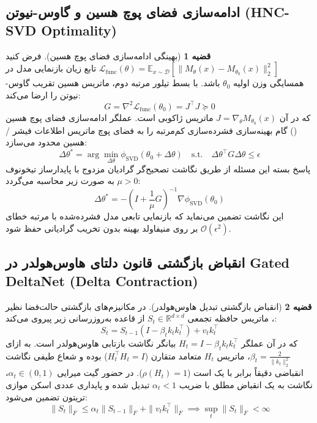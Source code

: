 \documentclass[12pt,a4paper]{report}
\theoremstyle{definition}
\newtheorem{theorem}{قضیه}[chapter]
\begin{document}
\subsection{ادامه‌سازی فضای پوچ هسین و گاوس-نیوتن (HNC-SVD Optimality)}
\begin{theorem}[بهینگی ادامه‌سازی فضای پوچ هسین]
\label{thm:hnc_optimality}
فرض کنید $\mathcal{L}_{\text{func}}(\theta) = \mathbb{E}_{x \sim \mathcal{D}} [ \| M_\theta(x) - M_{\theta_0}(x) \|_2^2 ]$ تابع زیان بازنمایی مدل در همسایگی وزن اولیه $\theta_0$ باشد. با بسط تیلور مرتبه دوم، ماتریس هسین تقریب گاوس-نیوتن را ارضا می‌کند:
\begin{equation}
G = \nabla^2 \mathcal{L}_{\text{func}}(\theta_0) = J^\top J \succeq 0
\end{equation}
که در آن $J = \nabla_\theta M_{\theta_0}(x)$ ماتریس ژاکوبی است. عملگر ادامه‌سازی فضای پوچ هسین () گام بهینه‌سازی فشرده‌سازی کم‌مرتبه را به فضای پوچ ماتریس اطلاعات فیشر / هسین محدود می‌سازد:
\begin{equation}
\Delta \theta^* = \arg\min_{\Delta \theta} \phi_{\text{SVD}}(\theta_0 + \Delta \theta) \quad \text{s.t.} \quad \Delta \theta^\top G \Delta \theta \le \epsilon
\end{equation}
پاسخ بسته این مسئله از طریق نگاشت تصحیح‌گر گرادیان مزدوج با پایدارساز تیخونوف $\mu > 0$ به صورت زیر محاسبه می‌گردد:
\begin{equation}
\Delta \theta^* = -\left( I + \frac{1}{\mu} G \right)^{-1} \nabla \phi_{\text{SVD}}(\theta_0)
\end{equation}
این نگاشت تضمین می‌نماید که بازنمایی تابعی مدل فشرده‌شده با مرتبه خطای $\mathcal{O}(\epsilon^2)$ بر روی منیفاولد بهینه بدون تخریب گرادیانی حفظ شود.
\end{theorem}

\subsection{انقباض بازگشتی قانون دلتای هاوس‌هولدر در Gated DeltaNet (Delta Contraction)}
\begin{theorem}[انقباض بازگشتی تبدیل هاوس‌هولدر]
\label{thm:deltanet_contraction}
در مکانیزم‌های بازگشتی حالت‌فضا نظیر ، ماتریس حافظه تجمعی $S_t \in \mathbb{R}^{d \times d}$ از قاعده به‌روزرسانی زیر پیروی می‌کند:
\begin{equation}
S_t = S_{t-1} \left( I - \beta_t k_t k_t^\top \right) + v_t k_t^\top
\end{equation}
که در آن عملگر $H_t = I - \beta_t k_t k_t^\top$ بیانگر نگاشت بازتابی هاوس‌هولدر است. به ازای $\beta_t = \frac{2}{\|k_t\|_2^2}$، ماتریس $H_t$ متعامد متقارن ($H_t^\top H_t = I$) بوده و شعاع طیفی نگاشت انقباضی دقیقاً برابر با یک است ($\rho(H_t) = 1$). در حضور گیت میرایی $\alpha_t \in (0, 1)$، نگاشت به یک انقباض مطلق با ضریب $\alpha_t < 1$ تبدیل شده و پایداری عددی اسکن موازی تریتون تضمین می‌شود:
\begin{equation}
\| S_t \|_F \le \alpha_t \| S_{t-1} \|_F + \| v_t k_t^\top \|_F \implies \sup_t \|S_t\|_F < \infty
\end{equation}
\end{theorem}
\end{document}
